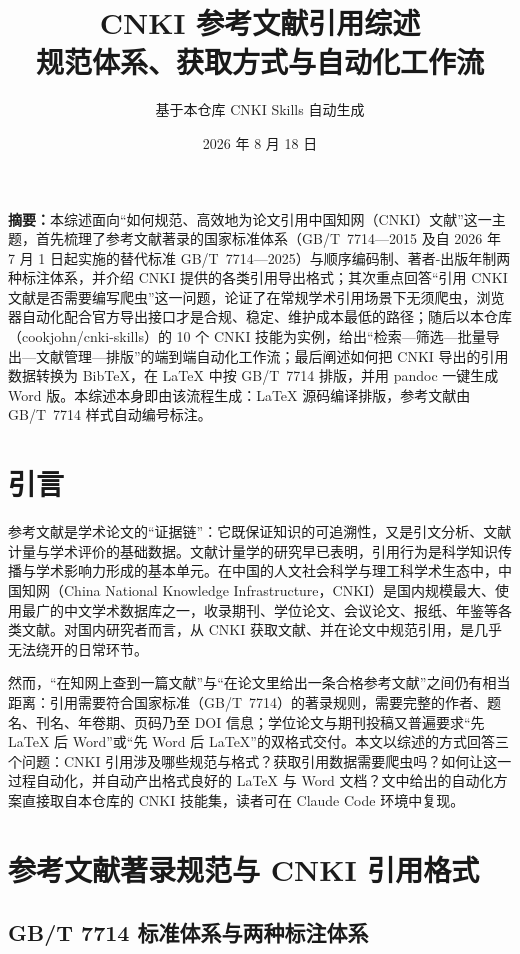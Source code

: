 \documentclass[UTF8, zihao=-4, fontset=fandol]{ctexart}
\title{\bfseries CNKI 参考文献引用综述\\[0.6em]
       \large 规范体系、获取方式与自动化工作流}
\author{基于本仓库 CNKI Skills 自动生成}
\date{2026 年 8 月 18 日}
\begin{document}
\maketitle
\tableofcontents
\vspace{1em}

\noindent\textbf{摘要：}本综述面向“如何规范、高效地为论文引用中国知网（CNKI）文献”这一主题，首先梳理了参考文献著录的国家标准体系（GB/T~7714—2015 及自 2026 年 7 月 1 日起实施的替代标准 GB/T~7714—2025）与顺序编码制、著者-出版年制两种标注体系，并介绍 CNKI 提供的各类引用导出格式；其次重点回答“引用 CNKI 文献是否需要编写爬虫”这一问题，论证了在常规学术引用场景下无须爬虫，浏览器自动化配合官方导出接口才是合规、稳定、维护成本最低的路径；随后以本仓库（cookjohn/cnki-skills）的 10 个 CNKI 技能为实例，给出“检索—筛选—批量导出—文献管理—排版”的端到端自动化工作流；最后阐述如何把 CNKI 导出的引用数据转换为 BibTeX，在 LaTeX 中按 GB/T~7714 排版，并用 pandoc 一键生成 Word 版。本综述本身即由该流程生成：LaTeX 源码编译排版，参考文献由 GB/T~7714 样式自动编号标注。

\section{引言}

参考文献是学术论文的“证据链”：它既保证知识的可追溯性，又是引文分析、文献计量与学术评价的基础数据。文献计量学的研究早已表明，引用行为是科学知识传播与学术影响力形成的基本单元\cite{qiu1988}。在中国的人文社会科学与理工科学术生态中，中国知网（China National Knowledge Infrastructure，CNKI）是国内规模最大、使用最广的中文学术数据库之一，收录期刊、学位论文、会议论文、报纸、年鉴等各类文献\cite{cnki}。对国内研究者而言，从 CNKI 获取文献、并在论文中规范引用，是几乎无法绕开的日常环节。

然而，“在知网上查到一篇文献”与“在论文里给出一条合格参考文献”之间仍有相当距离：引用需要符合国家标准（GB/T~7714）的著录规则，需要完整的作者、题名、刊名、年卷期、页码乃至 DOI 信息；学位论文与期刊投稿又普遍要求“先 LaTeX 后 Word”或“先 Word 后 LaTeX”的双格式交付。本文以综述的方式回答三个问题：CNKI 引用涉及哪些规范与格式？获取引用数据需要爬虫吗？如何让这一过程自动化，并自动产出格式良好的 LaTeX 与 Word 文档？文中给出的自动化方案直接取自本仓库的 CNKI 技能集\cite{cnki_skills}，读者可在 Claude Code 环境中复现。

\section{参考文献著录规范与 CNKI 引用格式}

\subsection{GB/T 7714 标准体系与两种标注体系}
\end{document}
